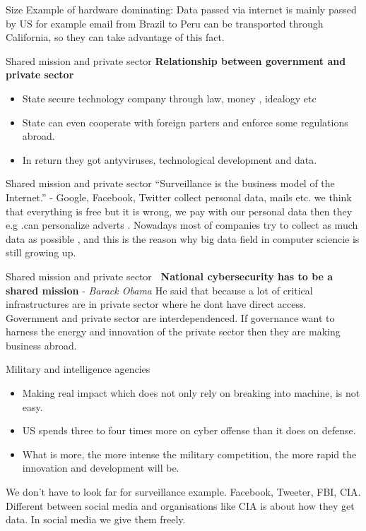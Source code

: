 \documentclass[xcolor=table]{beamer}
\begin{document}
\begin{frame}{Size}
Example of hardware dominating:\newline \newline
Data passed via internet is mainly passed by US for example email from Brazil to Peru can be transported through California, so they can take advantage of this fact.
\end{frame}
\begin{frame}{Shared mission and private sector}
\textbf{Relationship between government and private sector}
\begin{itemize}
\item State secure technology company through law, money , idealogy etc
\item State can even cooperate with foreign parters and enforce some regulations abroad.  
\item In return they got antyviruses, technological development and data. 
\end{itemize}
\end{frame}
\begin{frame}{Shared mission and private sector}
“Surveillance is the business model of the Internet.” - Google, Facebook, Twitter collect personal data, mails etc. we think that everything is free but it is wrong, we pay with our personal data
 then they e.g .can personalize adverts .
 \newline \newline Nowadays most of companies try to collect as much data as possible , and this is the reason why big data field in computer sciencie is still growing up.
\end{frame}
\begin{frame}{Shared mission and private sector}
\textbf{~\newline National cybersecurity has to be a shared mission} - \textit{Barack Obama}\newline\newline
He said that because a lot of critical infrastructures are in private sector where he dont have direct access.
Government and private sector are interdependenced.
\newline\newline
If governance want to harness  the energy and innovation of the private sector then they are making business abroad.
\end{frame}
\begin{frame}{Military and intelligence agencies}
\begin{itemize}
\item Making real impact which does not only rely on breaking into machine, is not  easy.
\item US spends three to four times more on cyber offense than it does on defense.
\item What is more, the more intense the military competition, the more
rapid the innovation and development will be.
\end{itemize}
We don't have to look far for surveillance example. Facebook, Tweeter, FBI, CIA. Different between social media and organisations like CIA is about how they get data. In social media we give them freely.
\end{frame}
\end{document}
